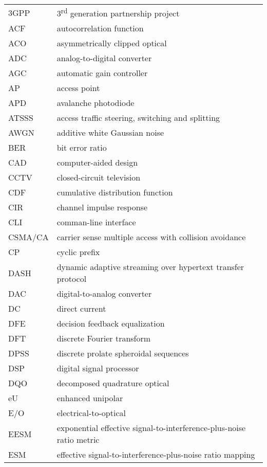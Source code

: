 
\begin{longtable}{ll}
 3GPP&3\textsuperscript{rd} generation partnership project\\
 ACF&autocorrelation function\\
 ACO&asymmetrically clipped optical\\
 ADC&analog-to-digital converter\\
 AGC&automatic gain controller\\
 AP&access point\\
 APD&avalanche photodiode\\
 ATSSS&access traffic steering, switching and splitting\\
 AWGN&additive white Gaussian noise\\
 BER&bit error ratio\\
 CAD&computer-aided design\\
 CCTV&closed-circuit television\\
 CDF&cumulative distribution function\\
 CIR&channel impulse response\\
 CLI&comman-line interface\\
 CSMA/CA&carrier sense multiple access with collision avoidance\\
 CP&cyclic prefix\\
 DASH&dynamic adaptive streaming over hypertext transfer protocol\\
 DAC&digital-to-analog converter\\
 DC&direct current\\
 DFE&decision feedback equalization\\
 DFT&discrete Fourier transform\\
 DPSS&discrete prolate spheroidal sequences\\
 DSP&digital signal processor\\
 DQO&decomposed quadrature optical\\
 eU&enhanced unipolar\\
 E/O&electrical-to-optical\\
 EESM&exponential effective signal-to-interference-plus-noise ratio metric\\
 ESM&effective signal-to-interference-plus-noise ratio mapping\\

\end{longtable}
